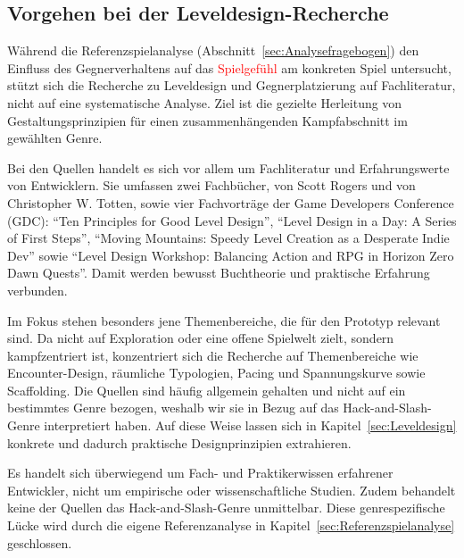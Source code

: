 \documentclass[../Main.tex]{subfiles}
\begin{document}
\subsection{Vorgehen bei der Leveldesign-Recherche} \label{sec:VorgehenLeveldesign}
Während die Referenzspielanalyse (Abschnitt~\ref{sec:Analysefragebogen}) den Einfluss des Gegnerverhaltens auf das \textcolor{red}{Spielgefühl} am konkreten Spiel untersucht, stützt sich die Recherche zu Leveldesign und Gegnerplatzierung auf Fachliteratur, nicht auf eine systematische Analyse. Ziel ist die gezielte Herleitung von Gestaltungsprinzipien für einen zusammenhängenden Kampfabschnitt im gewählten Genre.

Bei den Quellen handelt es sich vor allem um Fachliteratur und Erfahrungswerte von Entwicklern. Sie umfassen zwei Fachbücher,  von Scott Rogers\autocite{rogers2014levelup} und  von Christopher W. Totten\autocite{totten2014architectural}, sowie vier Fachvorträge der Game Developers Conference (GDC): \enquote{Ten Principles for Good Level Design}\autocite{gdc_tenprinciples2010}, \enquote{Level Design in a Day: A Series of First Steps}\autocite{gdc_leveldesignaday2020}, \enquote{Moving Mountains: Speedy Level Creation as a Desperate Indie Dev}\autocite{gdc_movingmountains2020} sowie \enquote{Level Design Workshop: Balancing Action and RPG in Horizon Zero Dawn Quests}\autocite{gdc_horizonquests2018}. Damit werden bewusst Buchtheorie und praktische Erfahrung verbunden.

Im Fokus stehen besonders jene Themenbereiche, die für den Prototyp relevant sind. Da  nicht auf Exploration oder eine offene Spielwelt zielt, sondern kampfzentriert ist, konzentriert sich die Recherche auf Themenbereiche wie Encounter-Design, räumliche Typologien, Pacing und Spannungskurve sowie Scaffolding. Die Quellen sind häufig allgemein gehalten und nicht auf ein bestimmtes Genre bezogen, weshalb wir sie in Bezug auf das Hack-and-Slash-Genre interpretiert haben. Auf diese Weise lassen sich in Kapitel~\ref{sec:Leveldesign} konkrete und dadurch praktische Designprinzipien extrahieren.

Es handelt sich überwiegend um Fach- und Praktikerwissen erfahrener Entwickler, nicht um empirische oder wissenschaftliche Studien. Zudem behandelt keine der Quellen das Hack-and-Slash-Genre unmittelbar. Diese genrespezifische Lücke wird durch die eigene Referenzanalyse in Kapitel~\ref{sec:Referenzspielanalyse} geschlossen.
\end{document}
